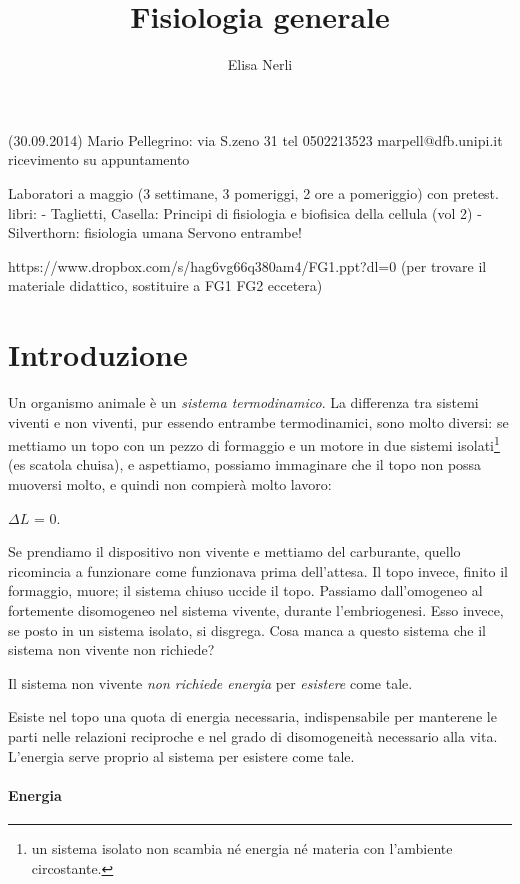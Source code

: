 \documentclass[a4paper,12pt]{article}
\begin{document}
\author{Elisa Nerli}
\title{Fisiologia generale}
\maketitle
\newpage
\tableofcontents
\newpage
\listoftodos

(30.09.2014)
Mario Pellegrino: via S.zeno 31 tel 0502213523 marpell@dfb.unipi.it
ricevimento su appuntamento

Laboratori a maggio (3 settimane, 3 pomeriggi, 2 ore a pomeriggio) con pretest. 
libri: - Taglietti, Casella: Principi di fisiologia e biofisica della cellula (vol 2) 	
	   - Silverthorn: fisiologia umana
Servono entrambe!

https://www.dropbox.com/s/hag6vg66q380am4/FG1.ppt?dl=0   (per trovare il materiale didattico, sostituire a FG1 FG2 eccetera)

\section{Introduzione}
Un organismo animale è un \emph{sistema termodinamico}. 
La differenza tra sistemi viventi e non viventi, pur essendo entrambe termodinamici, sono molto diversi: se mettiamo un topo con un pezzo di formaggio e un motore in due sistemi isolati\footnote{un sistema isolato non scambia né energia né materia con l'ambiente circostante.} (es scatola chuisa), e aspettiamo, possiamo immaginare che il topo non possa muoversi molto, e quindi non compierà molto lavoro: 

$\Delta L$ = 0. 

Se prendiamo il dispositivo non vivente e mettiamo del carburante, quello ricomincia a funzionare come funzionava prima dell'attesa. Il topo invece, finito il formaggio, muore; il sistema chiuso uccide il topo.
Passiamo dall'omogeneo al fortemente disomogeneo nel sistema vivente, durante l'embriogenesi. Esso invece, se posto in un sistema isolato, si disgrega.
Cosa manca a questo sistema che il sistema non vivente non richiede?

Il sistema non vivente \emph{non richiede energia} per \emph{esistere} come tale. 

Esiste nel topo una quota di energia necessaria, indispensabile per manterene le parti nelle relazioni reciproche e nel grado di disomogeneità necessario alla vita. L'energia serve proprio al sistema per esistere come tale.
\paragraph{Energia}
\end{document}
